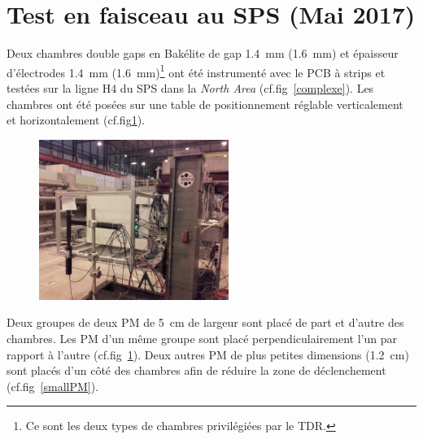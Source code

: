 \section{Test en faisceau au SPS (Mai 2017)}
\vspace{-0.4cm}
Deux chambres double gaps en Bakélite de gap \SI{1.4}{\milli\meter} (\SI{1.6}{\milli\meter}) et épaisseur d'électrodes \SI{1.4}{\milli\meter} (\SI{1.6}{\milli\meter})\footnote{Ce sont les deux types de chambres privilégiées par le TDR.} ont été instrumenté avec le PCB à strips et testées sur la ligne H4 du SPS dans la \textit{North Area} (cf.fig~\ref{complexe}). Les chambres ont été posées sur une table de positionnement réglable verticalement et horizontalement (cf.fig\ref{setup2017}).
\begin{figure}[ht!]
	\centering
	\includegraphics[width=0.55\textwidth]{ELE/setup2017.jpg}
	\label{setup2017}
\end{figure}

Deux groupes de deux PM de \SI{5}{\centi\meter} de largeur sont placé de part et d'autre des chambres. Les PM d'un même groupe sont placé perpendiculairement l'un par rapport à l'autre (cf.fig~\ref{setup2017}). Deux autres PM de plus petites dimensions (\SI{1.2}{\centi\meter}) sont placés d'un côté des chambres afin de réduire la zone de déclenchement (cf.fig~\ref{smallPM}).  

